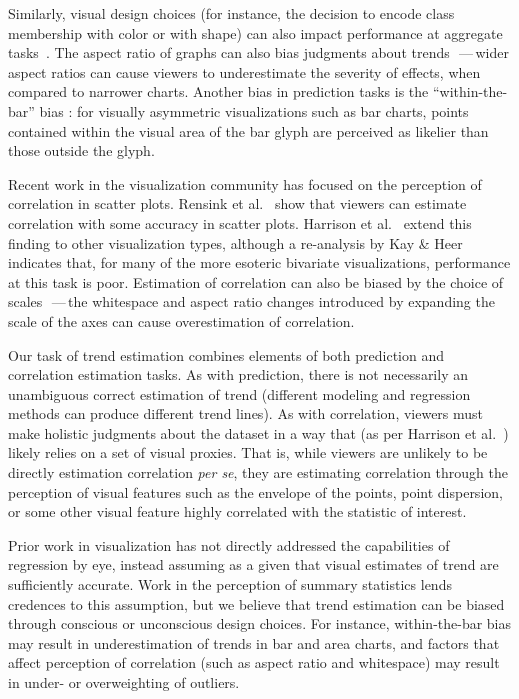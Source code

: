 \documentclass{sigchi}
\begin{document}
Similarly, visual design choices (for instance, the decision to encode class membership with color or with shape) can also impact performance at aggregate tasks~\cite{gleicher2013perception,lewandowsky1989discriminating}. The aspect ratio of graphs can also bias judgments about trends~\cite{beattie2002impact}\,---\,wider aspect ratios can cause viewers to underestimate the severity of effects, when compared to narrower charts. Another bias in prediction tasks is the ``within-the-bar'' bias \cite{newman2012bar}: for visually asymmetric visualizations such as bar charts, points contained within the visual area of the bar glyph are perceived as likelier than those outside the glyph.

Recent work in the visualization community has focused on the perception of correlation in scatter plots. Rensink et al.~\cite{rensink2010perception} show that viewers can estimate correlation with some accuracy in scatter plots. Harrison et al.~\cite{harrison2014ranking} extend this finding to other visualization types, although a re-analysis by Kay \& Heer~\cite{kay2016beyond} indicates that, for many of the more esoteric bivariate visualizations, performance at this task is poor. Estimation of correlation can also be biased by the choice of scales~\cite{cleveland1982variables}\,---\,the whitespace and aspect ratio changes introduced by expanding the scale of the axes can cause overestimation of correlation.

Our task of trend estimation combines elements of both prediction and correlation estimation tasks. As with prediction, there is not necessarily an unambiguous correct estimation of trend (different modeling and regression methods can produce different trend lines). As with correlation, viewers must make holistic judgments about the dataset in a way that (as per Harrison et al.~\cite{harrison2014ranking}) likely relies on a set of visual proxies. That is, while viewers are unlikely to be directly estimation correlation \emph{per se}, they are estimating correlation through the perception of visual features such as the envelope of the points, point dispersion, or some other visual feature highly correlated with the statistic of interest. 

Prior work in visualization has not directly addressed the capabilities of regression by eye, instead assuming as a given that visual estimates of trend are sufficiently accurate. Work in the perception of summary statistics lends credences to this assumption, but we believe that trend estimation can be biased through conscious or unconscious design choices. For instance, within-the-bar bias may result in underestimation of trends in bar and area charts, and factors that affect perception of correlation (such as aspect ratio and whitespace) may result in under- or overweighting of outliers.
\end{document}

